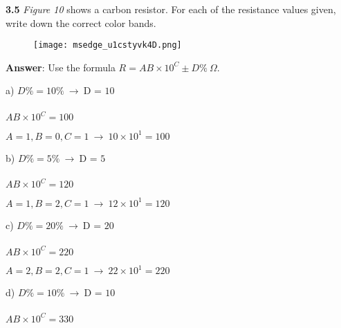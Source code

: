 \documentclass{article}
\begin{document}
{\newpage

{\Large \textbf{3.5} \textit{Figure 10} shows a carbon resistor. For each of the resistance values given, write down the correct color bands.}

\begin{figure}[H]
    \centering
    \texttt{[image: msedge\_u1cstyvk4D.png]}
\end{figure}

{\Large {}}

{\vspace{4mm}}

{\Large \textbf{Answer}: Use the formula $R = AB \times 10^{C} \pm D\% \  \Omega$.}

{\vspace{4mm}}

{\Large a) $D\% = 10\% \ \rightarrow \ \boxed{\text{D = 10}}$ \\\\ $AB \times 10^{C} = 100$}

{\vspace{4mm}}

{\Large $\boxed{A = 1, B = 0, C = 1} \ \rightarrow \ 10 \times 10^{1} = 100$}

{\vspace{8mm}}

{\Large b) $D\% = 5\% \ \rightarrow \ \boxed{\text{D = 5}}$ \\\\ $AB \times 10^{C} = 120$}

{\vspace{4mm}}

{\Large $\boxed{A = 1, B = 2, C = 1} \ \rightarrow \ 12 \times 10^{1} = 120$}

{\vspace{8mm}}

{\Large c) $D\% = 20\% \ \rightarrow \ \boxed{\text{D = 20}}$ \\\\ $AB \times 10^{C} = 220$}

{\vspace{4mm}}

{\Large $\boxed{A = 2, B = 2, C = 1} \ \rightarrow \ 22 \times 10^{1} = 220$}

{\vspace{8mm}}

{\Large d) $D\% = 10\% \ \rightarrow \ \boxed{\text{D = 10}}$ \\\\ $AB \times 10^{C} = 330$}

}
\end{document}
